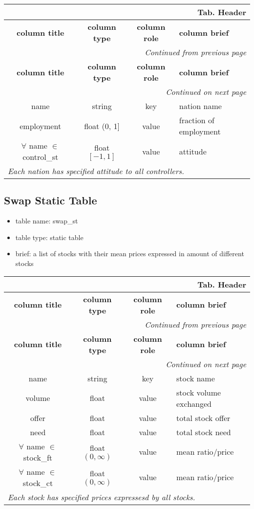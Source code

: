 \documentclass[a4paper,oneside,titlepage]{report}
\newcommand*{\LTHeaderIV}[5]{
  \multicolumn{4}{r}{\textbf{Tab. \thesubsection} \textbf{#1}}\\    
  \hline
  \textbf{#2} & \textbf{#3} & \textbf{#4} & \textbf{#5}\\
  \hline
  
  \endfirsthead
  \multicolumn{4}{r}{\textit{Continued from previous page}}\\    
  \hline
  \textbf{#2} & \textbf{#3} & \textbf{#4} & \textbf{#5}\\
  \hline
  \endhead
  \hline
  \multicolumn{4}{r}{\textit{Continued on next page}}\\
  \endfoot
  \hline
  \endlastfoot  
}
\begin{document}
\vspace{-0.5cm}
\begin{longtable}{ |c|c|c|l| } 
  \LTHeaderIV{Header}{column title}{column type}{column role}{column brief}                    
  name & string & key & nation name\\
  employment & float (0, 1] & value & fraction of employment\\
  $\forall$ name $\in$ control\_st  & float $[-1, 1]$ & value & attitude\\
  \multicolumn{4}{|l|}{\textit{Each nation has specified attitude to all controllers.}}\\
\end{longtable}        


\subsection{Swap Static Table}
\begin{itemize}
  \setlength{\itemsep}{0pt}
  \setlength{\parskip}{0pt}
\item table name: swap\_st  
\item table type: static table   
\item brief: a list of stocks with their mean prices expressed in amount of different stocks 
\end{itemize}

\vspace{-0.5cm}
\begin{longtable}{ |c|c|c|l| } 
  \LTHeaderIV{Header}{column title}{column type}{column role}{column brief}                    
  name & string & key & stock name\\
  volume & float & value & stock volume exchanged\\
  offer & float & value & total stock offer\\
  need & float & value & total stock need\\
  $\forall$ name $\in$ stock\_ft & float $(0, \infty)$ & value & mean ratio$/$price\\
  $\forall$ name $\in$ stock\_ct & float $(0, \infty)$ & value & mean ratio$/$price\\
  \multicolumn{4}{|l|}{\textit{Each stock has specified prices expressesd by all stocks.}}\\
\end{longtable}        

\end{document}
